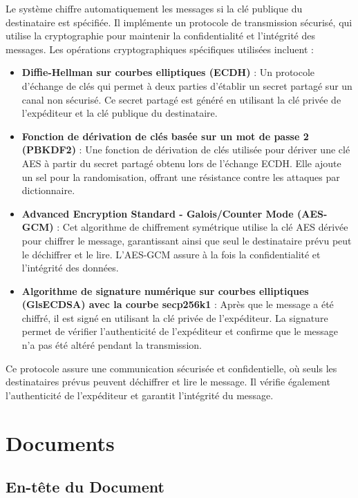 Le système chiffre automatiquement les messages si la clé publique du destinataire est spécifiée. Il implémente un protocole de transmission sécurisé, qui utilise la cryptographie pour maintenir la confidentialité et l'intégrité des messages. Les opérations cryptographiques spécifiques utilisées incluent :

\begin{itemize}
  \item \textbf{Diffie-Hellman sur courbes elliptiques (\Gls{ECDH})} : Un protocole d'échange de clés qui permet à deux parties d'établir un secret partagé sur un canal non sécurisé. Ce secret partagé est généré en utilisant la clé privée de l'expéditeur et la clé publique du destinataire.
  \item \textbf{Fonction de dérivation de clés basée sur un mot de passe 2 (\Gls{PBKDF2})} : Une fonction de dérivation de clés utilisée pour dériver une clé AES à partir du secret partagé obtenu lors de l'échange \Gls{ECDH}. Elle ajoute un sel pour la randomisation, offrant une résistance contre les attaques par dictionnaire.
  \item \textbf{Advanced Encryption Standard - Galois/Counter Mode (AES-GCM)} : Cet algorithme de chiffrement symétrique utilise la clé \Gls{AES} dérivée pour chiffrer le message, garantissant ainsi que seul le destinataire prévu peut le déchiffrer et le lire. L'AES-GCM assure à la fois la confidentialité et l'intégrité des données.
  \item \textbf{Algorithme de signature numérique sur courbes elliptiques (Gls{ECDSA}) avec la courbe secp256k1} : Après que le message a été chiffré, il est signé en utilisant la clé privée de l'expéditeur. La signature permet de vérifier l'authenticité de l'expéditeur et confirme que le message n'a pas été altéré pendant la transmission.
\end{itemize}

Ce protocole assure une communication sécurisée et confidentielle, où seuls les destinataires prévus peuvent déchiffrer et lire le message.
Il vérifie également l'authenticité de l'expéditeur et garantit l'intégrité du message.

\section{Documents}

\subsection{En-tête du Document \label{doc_header}}

